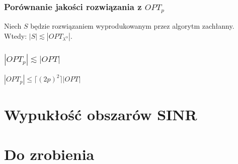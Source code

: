 \documentclass[polish, t,10pt]{beamer}
\begin{document}
\begin{frame}
    \frametitle{Porównanie jakości rozwiązania z $OPT_p$}
    \begin{lemma}
        Niech $S$ będzie rozwiązaniem wyprodukowanym przez algorytm zachłanny. Wtedy:
        $|S| \lesssim |OPT_{\lambda^{\alpha}}|$.
    \end{lemma}
\end{frame}

\begin{frame}
    \frametitle{$|OPT_p| \lesssim |OPT|$}
    \begin{lemma}
        $|OPT_p| \le \lceil (2p)^2 \rceil |OPT|$
    \end{lemma}
\end{frame}

\section{Wypukłość obszarów SINR}
\section{Do zrobienia}
\end{document}
